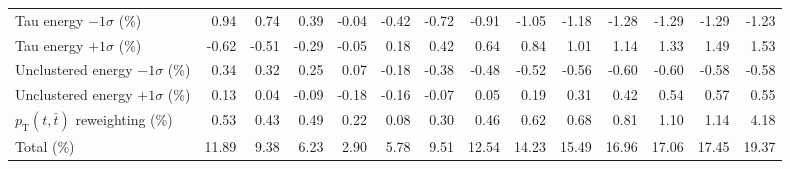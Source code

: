 \begin{table}[htbp]
{\begin{tabular}{lrrrrrrrrrrrrr}
Tau energy $-1\sigma$ (\%) & 0.94 & 0.74 & 0.39 & -0.04 & -0.42 & -0.72 & -0.91 & -1.05 & -1.18 & -1.28 & -1.29 & -1.29 & -1.23 \\ 
Tau energy $+1\sigma$ (\%) & -0.62 & -0.51 & -0.29 & -0.05 & 0.18 & 0.42 & 0.64 & 0.84 & 1.01 & 1.14 & 1.33 & 1.49 & 1.53 \\ 
Unclustered energy $-1\sigma$ (\%) & 0.34 & 0.32 & 0.25 & 0.07 & -0.18 & -0.38 & -0.48 & -0.52 & -0.56 & -0.60 & -0.60 & -0.58 & -0.58 \\ 
Unclustered energy $+1\sigma$ (\%) & 0.13 & 0.04 & -0.09 & -0.18 & -0.16 & -0.07 & 0.05 & 0.19 & 0.31 & 0.42 & 0.54 & 0.57 & 0.55 \\ 
$p_\mathrm{T}(t,\bar{t})$ reweighting (\%) & 0.53 & 0.43 & 0.49 & 0.22 & 0.08 & 0.30 & 0.46 & 0.62 & 0.68 & 0.81 & 1.10 & 1.14 & 4.18 \\ 
\hline 
Total (\%) & 11.89  & 9.38  & 6.23  & 2.90  & 5.78  & 9.51  & 12.54  & 14.23  & 15.49  & 16.96  & 17.06  & 17.45  & 19.37 \\ 
\hline 
\end{tabular}
}
\end{table}
